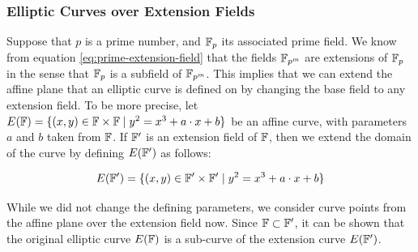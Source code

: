 \subsubsection{Elliptic Curves over Extension Fields}
\label{sec:curve-extensions}
 Suppose that $p$ is a prime number, and $\mathbb{F}_p$ its associated prime field. We know from equation \eqref{eq:prime-extension-field} that the fields $\mathbb{F}_{p^m}$ are extensions of $\mathbb{F}_p$ in the sense that $\mathbb{F}_{p}$ is a subfield of $\mathbb{F}_{p^m}$. This implies that we can extend the affine plane that an elliptic curve is defined on by changing the base field to any extension field. To be more precise, let 
$E(\mathbb{F})=\{ (x,y)\in \mathbb{F} \times \mathbb{F} \;|\; y^2 = x^3 +a\cdot x +b \}$ be an affine  curve, with parameters $a$ and $b$ taken from $\mathbb{F}$. If $\mathbb{F}'$ is an extension field of $\mathbb{F}$, then we extend the domain of the curve by defining $E(\mathbb{F}')$ as follows:

\begin{equation}\label{elliptic-curve-extension}
E(\mathbb{F}')=\{ (x,y)\in \mathbb{F}' \times \mathbb{F}' \;|\; y^2 = x^3 +a\cdot x +b \}
\end{equation}   

While we did not change the defining parameters, we consider curve points from the affine plane over the extension field now. Since $\mathbb{F}\subset \mathbb{F}'$, it can be shown that the original elliptic curve $E(\mathbb{F})$ is a sub-curve of the extension curve $E(\mathbb{F}')$.

